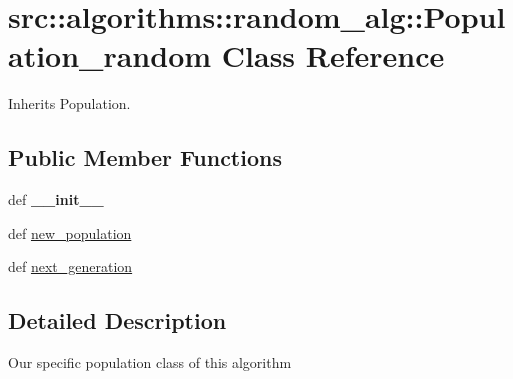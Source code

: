 \hypertarget{classsrc_1_1algorithms_1_1random__alg_1_1Population__random}{
\section{src::algorithms::random\_\-alg::Population\_\-random Class Reference}
\label{classsrc_1_1algorithms_1_1random__alg_1_1Population__random}
}


Inherits Population.

\subsection*{Public Member Functions}
\begin{DoxyCompactItemize}
\item 
\hypertarget{classsrc_1_1algorithms_1_1random__alg_1_1Population__random_aa5b5de487baf0c8278dcd7392f863472}{
def {\bfseries \_\-\_\-init\_\-\_\-}}
\label{classsrc_1_1algorithms_1_1random__alg_1_1Population__random_aa5b5de487baf0c8278dcd7392f863472}

\item 
def \hyperlink{classsrc_1_1algorithms_1_1random__alg_1_1Population__random_a2f37257ed691f5e9087b2f79d0a94878}{new\_\-population}
\item 
def \hyperlink{classsrc_1_1algorithms_1_1random__alg_1_1Population__random_a53f2df6521ff3f4c48f36faa31f9faf0}{next\_\-generation}
\end{DoxyCompactItemize}


\subsection{Detailed Description}
\begin{DoxyVerb}
Our specific population class of this algorithm
\end{DoxyVerb}
 

